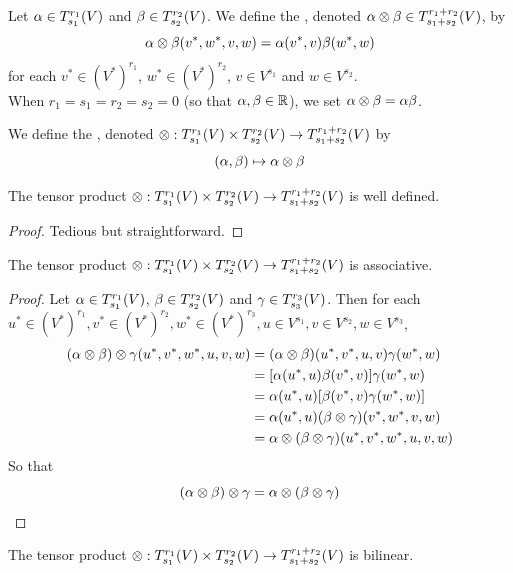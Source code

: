 \documentclass{book}
\begin{document}
	\begin{defn}
	Let $\alpha \in T^{r_{1}}_{s_{1}}(V)$ and $\beta \in T^{r_{2}}_{s_{2}}(V)$. We define the , denoted $\alpha \otimes \beta \in T^{r_1+r_2}_{s_1+s_2}(V)$, by $$\alpha \otimes \beta (v^*, w^*, v, w) = \alpha(v^*, v) \beta(w^*, w)$$ for each $v^* \in (V^*)^{r_1}$, $w^* \in (V^*)^{r_2}$, $v \in V^{s_1}$ and $w \in V^{s_2}$.\\
	When $r_1=s_1=r_2=s_2= 0$ (so that $\alpha, \beta \in \mathbb{R}$), we set $\alpha \otimes \beta = \alpha \beta$.
	\end{defn}
	
	\begin{defn}
	We define the , denoted $\otimes : T^{r_{1}}_{s_{1}}(V) \times  T^{r_{2}}_{s_{2}}(V) \rightarrow T^{r_1 + r_2}_{s_1 + s_2}(V)$ by $$(\alpha, \beta) \mapsto \alpha \otimes \beta $$   
	\end{defn}
	
	\begin{ex}
	The tensor product $\otimes : T^{r_{1}}_{s_{1}}(V) \times  T^{r_{2}}_{s_{2}}(V) \rightarrow T^{r_1 + r_2}_{s_1 + s_2}(V)$ is well defined. 
	\end{ex}
	
	\begin{proof}
	Tedious but straightforward.
\end{proof}	
	
	\begin{ex}
	The tensor product $\otimes : T^{r_{1}}_{s_{1}}(V) \times  T^{r_{2}}_{s_{2}}(V) \rightarrow T^{r_1 + r_2}_{s_1 + s_2}(V)$ is associative. 
	\end{ex}
	
	\begin{proof}
	Let $\alpha \in T^{r_{1}}_{s_{1}}(V)$, $\beta \in T^{r_{2}}_{s_{2}}(V)$ and $\gamma \in T^{r_{3}}_{s_{3}}(V)$. Then for each $u^* \in (V^*)^{r_1}, v^* \in (V^*)^{r_2}, w^* \in (V^*)^{r_3}, u \in V^{s_1}, v \in V^{s_2}, w \in V^{s_3}$,  
	\begin{align*}
	(\alpha \otimes \beta) \otimes \gamma (u^*, v^*, w^*, u, v, w) 
	& = (\alpha \otimes \beta) (u^*, v^*, u, v) \gamma (w^*, w) \\
	& = [\alpha(u^*, u) \beta(v^*, v)] \gamma(w^*, w) \\
	& = \alpha(u^*, u) [\beta(v^*, v) \gamma(w^*, w)] \\
	& = \alpha(u^*, u) (\beta \otimes \gamma) (v^*, w^*, v, w) \\
	& = \alpha \otimes (\beta \otimes \gamma)(u^*, v^*, w^*, u, v, w) 
	\end{align*}
	So that $$(\alpha \otimes \beta) \otimes \gamma = \alpha \otimes (\beta \otimes \gamma)$$
\end{proof}		
	
	\begin{ex}
	The tensor product $\otimes : T^{r_{1}}_{s_{1}}(V) \times  T^{r_{2}}_{s_{2}}(V) \rightarrow T^{r_1 + r_2}_{s_1 + s_2}(V)$ is bilinear. 
	\end{ex}
	
\end{document}
